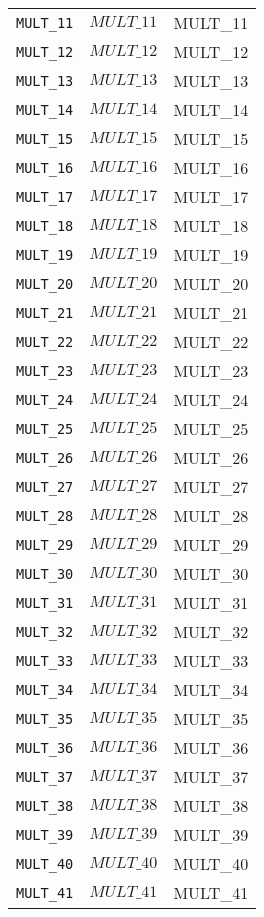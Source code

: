 \begin{center}
\begin{longtable}{ccc}
\texttt{MULT\_11} & $MULT\_11$ & MULT\_11\\
\texttt{MULT\_12} & $MULT\_12$ & MULT\_12\\
\texttt{MULT\_13} & $MULT\_13$ & MULT\_13\\
\texttt{MULT\_14} & $MULT\_14$ & MULT\_14\\
\texttt{MULT\_15} & $MULT\_15$ & MULT\_15\\
\texttt{MULT\_16} & $MULT\_16$ & MULT\_16\\
\texttt{MULT\_17} & $MULT\_17$ & MULT\_17\\
\texttt{MULT\_18} & $MULT\_18$ & MULT\_18\\
\texttt{MULT\_19} & $MULT\_19$ & MULT\_19\\
\texttt{MULT\_20} & $MULT\_20$ & MULT\_20\\
\texttt{MULT\_21} & $MULT\_21$ & MULT\_21\\
\texttt{MULT\_22} & $MULT\_22$ & MULT\_22\\
\texttt{MULT\_23} & $MULT\_23$ & MULT\_23\\
\texttt{MULT\_24} & $MULT\_24$ & MULT\_24\\
\texttt{MULT\_25} & $MULT\_25$ & MULT\_25\\
\texttt{MULT\_26} & $MULT\_26$ & MULT\_26\\
\texttt{MULT\_27} & $MULT\_27$ & MULT\_27\\
\texttt{MULT\_28} & $MULT\_28$ & MULT\_28\\
\texttt{MULT\_29} & $MULT\_29$ & MULT\_29\\
\texttt{MULT\_30} & $MULT\_30$ & MULT\_30\\
\texttt{MULT\_31} & $MULT\_31$ & MULT\_31\\
\texttt{MULT\_32} & $MULT\_32$ & MULT\_32\\
\texttt{MULT\_33} & $MULT\_33$ & MULT\_33\\
\texttt{MULT\_34} & $MULT\_34$ & MULT\_34\\
\texttt{MULT\_35} & $MULT\_35$ & MULT\_35\\
\texttt{MULT\_36} & $MULT\_36$ & MULT\_36\\
\texttt{MULT\_37} & $MULT\_37$ & MULT\_37\\
\texttt{MULT\_38} & $MULT\_38$ & MULT\_38\\
\texttt{MULT\_39} & $MULT\_39$ & MULT\_39\\
\texttt{MULT\_40} & $MULT\_40$ & MULT\_40\\
\texttt{MULT\_41} & $MULT\_41$ & MULT\_41\\

\end{longtable}
\end{center}
